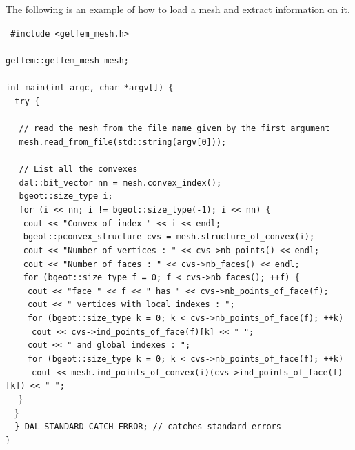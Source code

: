 \documentclass[11pt,a4paper]{article}
\begin{document}
The following is an example of how to load a mesh and extract information on it. \\[0.5cm]
{\tt
  \#include <getfem\_mesh.h> \\
  \\
  getfem::getfem\_mesh mesh; \\
  \\
  int main(int argc, char *argv[]) \{ \\
    $\mbox{}\ \ $ try \{ \\
    $\mbox{}\ \ \ \ $ \\
    $\mbox{}\ \ \ \ $ // read the mesh from the file name given by the first argument \\
    $\mbox{}\ \ \ \ $ mesh.read\_from\_file(std::string(argv[0])); \\
    $\mbox{}\ \ \ \ $ \\
    $\mbox{}\ \ \ \ $ // List all the convexes\\
    $\mbox{}\ \ \ \ $ dal::bit\_vector nn = mesh.convex\_index(); \\
    $\mbox{}\ \ \ \ $ bgeot::size\_type i; \\
    $\mbox{}\ \ \ \ $ for (i << nn; i != bgeot::size\_type(-1); i << nn) \{\\
    $\mbox{}\ \ \ \ \ \ $ cout << "Convex of index " << i << endl; \\
    $\mbox{}\ \ \ \ \ \ $ bgeot::pconvex\_structure cvs =  mesh.structure\_of\_convex(i); \\
    $\mbox{}\ \ \ \ \ \ $ cout << "Number of vertices : " << cvs->nb\_points() << endl; \\
    $\mbox{}\ \ \ \ \ \ $ cout << "Number of faces : " << cvs->nb\_faces() << endl;\\
    $\mbox{}\ \ \ \ \ \ $ for (bgeot::size\_type f = 0; f < cvs->nb\_faces(); ++f) \{\\
    $\mbox{}\ \ \ \ \ \ \ \ $ cout << "face " << f << " has " << cvs->nb\_points\_of\_face(f); \\
    $\mbox{}\ \ \ \ \ \ \ \ $ cout << " vertices with local indexes : "; \\
    $\mbox{}\ \ \ \ \ \ \ \ $ for (bgeot::size\_type k = 0; k < cvs->nb\_points\_of\_face(f); ++k) \\
    $\mbox{}\ \ \ \ \ \ \ \ \ \ $ cout << cvs->ind\_points\_of\_face(f)[k] << " "; \\ 
    $\mbox{}\ \ \ \ \ \ \ \ $ cout << " and global indexes : ";\\
    $\mbox{}\ \ \ \ \ \ \ \ $ for (bgeot::size\_type k = 0; k < cvs->nb\_points\_of\_face(f); ++k) \\
    $\mbox{}\ \ \ \ \ \ \ \ \ \ $ cout << mesh.ind\_points\_of\_convex(i)(cvs->ind\_points\_of\_face(f)[k]) << " "; \\ 
    $\mbox{}\ \ \ \ \ \ \}$ \\
    $\mbox{}\ \ \ \ \}$ \\
    $\mbox{}\ \ $ \} DAL\_STANDARD\_CATCH\_ERROR; // catches standard errors\\
  \}

}
\end{document}
